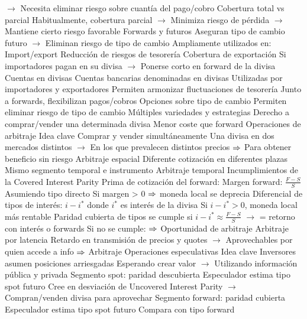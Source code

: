 \documentclass{nuevotema}
\begin{document}
\begin{esquemal}
				\4[] $\to$ Necesita eliminar riesgo sobre cuantía del pago/cobro
				\4 Cobertura total vs parcial
				\4[] Habitualmente, cobertura parcial
				\4[] $\to$ Minimiza riesgo de pérdida
				\4[] $\to$ Mantiene cierto riesgo favorable
			\3 Forwards y futuros
				\4 Aseguran tipo de cambio futuro
				\4[] $\to$ Eliminan riesgo de tipo de cambio
				\4 Ampliamente utilizados en:
				\4[] Import/export
				\4[] Reducción de riesgos de tesorería
				\4 Cobertura de exportación
				\4[] Si importadores pagan en su divisa
				\4[] $\to$ Ponerse corto en forward de la divisa
			\3 Cuentas en divisas
				\4 Cuentas bancarias denominadas en divisas
				\4 Utilizadas por importadores y exportadores
				\4 Permiten armonizar fluctuaciones de tesorería
				\4 Junto a forwards, flexibilizan pagos/cobros
			\3 Opciones sobre tipo de cambio
				\4 Permiten eliminar riesgo de tipo de cambio
				\4 Múltiples variedades y estrategias
				\4 Derecho a comprar/vender una determinada divisa
				\4 Menor coste que forward
		\2 Operaciones de arbitraje
			\3 Idea clave
				\4 Comprar y vender simultáneamente
				\4[] Una divisa en dos mercados distintos
				\4[] $\to$ En los que prevalecen distintos precios
				\4[] $\Rightarrow$ Para obtener beneficio sin riesgo
			\3 Arbitraje espacial
				\4 Diferente cotización en diferentes plazas
				\4 Mismo segmento temporal e instrumento
			\3 Arbitraje temporal
				\4 Incumplimientos de la Covered Interest Parity
				\4 Prima de cotización del forward:
				\4[] Margen forward: $\frac{F-S}{S}$
				\4[] Asumiendo tipo directo
				\4[] Si margen > 0 $\Rightarrow$ moneda local se deprecia
				\4 Diferencial de tipos de interés:
				\4[] $i-i^*$ donde $i^*$ es interés de la divisa
				\4[] Si $i-i^* > 0$, moneda local más rentable
				\4 Paridad cubierta de tipos se cumple si
				\4[] $i-i^* \approx \frac{F-S}{S}$
				\4[] $\to$ = retorno con interés o forwards
				\4 Si no se cumple:
				\4[] $\Rightarrow$ Oportunidad de arbitraje
			\3 Arbitraje por latencia
				\4 Retardo en transmisión de precios y quotes
				\4[] $\to$ Aprovechables por quien accede a info
				\4[] $\Rightarrow$ Arbitraje
		\2 Operaciones especulativas
			\3 Idea clave
				\4 Inversores asumen posiciones arriesgadas
				\4[] Esperando crear valor
				\4[] $\to$ Utilizando información pública y privada
			\3 Segmento spot: paridad descubierta
				\4 Especulador estima tipo spot futuro
				\4[] Cree en desviación de Uncovered Interest Parity
				\4[] $\to$ Compran/venden divisa para aprovechar
			\3 Segmento forward: paridad cubierta
				\4 Especulador estima tipo spot futuro
				\4[] Compara con tipo forward

\end{esquemal}
\end{document}
